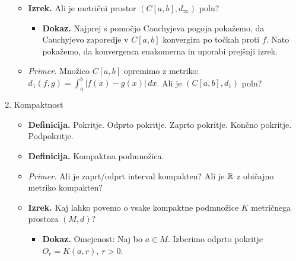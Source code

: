 \begin{enumerate}
\begin{itemize}
\begin{itemize}
        \end{itemize}
        \item \colorbox{blue!30}{\textbf{Izrek.}} Ali je metrični prostor $(C[a,b], d_\infty)$ poln?
        \begin{itemize}
            \item \colorbox{green!30}{\textbf{Dokaz.}} Najprej s pomočjo Cauchyjeva pogoja pokažemo, da Cauchyjevo zaporedje v $C[a,b]$ konvergira po točkah proti $f$. Nato pokažemo, da konvergenca enakomerna in uporabi prejšnji izrek.
        \end{itemize}
        \item \colorbox{yellow!30}{\emph{Primer.}} Množico $C[a,b]$ opremimo z metriko: $d_1(f,g)=\int_{a}^{b}|f(x)-g(x)|  \,dx $. Ali je $(C[a,b], d_1)$ poln?
    \end{itemize}

    \item Kompaktnost
    \begin{itemize}
        \item \colorbox{purple!30}{\textbf{Definicija.}} Pokritje. Odprto pokritje. Zaprto pokritje. Končno pokritje. Podpokritje.
        \item \colorbox{purple!30}{\textbf{Definicija.}} Kompaktna podmnožica. 
        \item \colorbox{yellow!30}{\emph{Primer.}} Ali je zaprt/odprt interval kompakten? Ali je $\mathbb{R}$ z običajno metriko kompakten?
        \item \colorbox{blue!30}{\textbf{Izrek.}} Kaj lahko povemo o vsake kompaktne podmnožice $K$ metričnega prostora $(M, d)$?
        \begin{itemize}
            \item \colorbox{green!30}{\textbf{Dokaz.}} Omejenost: Naj bo $a \in M$. Izberimo odprto pokritje $O_r = K(a, r), \ r > 0$.
            

\end{itemize}
\end{itemize}
\end{enumerate}

